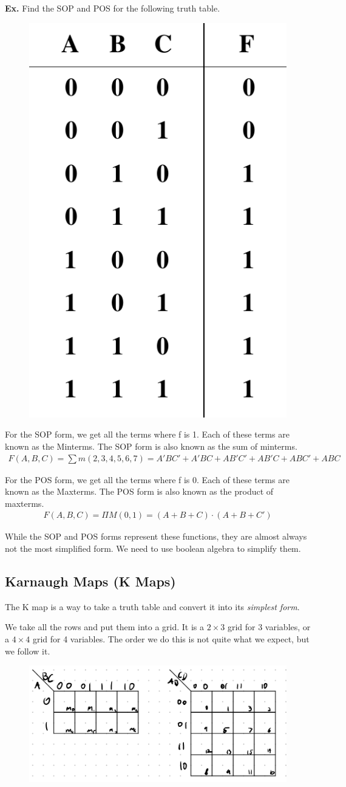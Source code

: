 \documentclass[12pt,letterpaper]{article} \usepackage{amsmath} \usepackage{graphicx}  \usepackage{longtable}  \usepackage{amssymb}
\begin{document}
        \begin{mdframed}
            \textbf{Ex. } Find the SOP and POS for the following truth table. 

            \begin{figure}[H]
                \centering
                \includegraphics[width=0.2\linewidth]{ex1.png}
            \end{figure}

            For the SOP form, we get all the terms where f is 1. Each of these terms are known as the Minterms. The SOP form is also known as the sum of minterms. 
            \begin{align*}
                F(A,B,C) = \sum m (2,3,4,5,6,7) = A'BC' + A'BC + AB'C' + AB'C + ABC' + ABC
            \end{align*}

            For the POS form, we get all the terms where f is 0. Each of these terms are known as the Maxterms. The POS form is also known as the product of maxterms. 
            \begin{align*}
                F(A,B,C) = \Pi M(0,1) = (A+B+C)\cdot (A+B+C')
            \end{align*}
        \end{mdframed}

        While the SOP and POS forms represent these functions, they are almost always not the most simplified form. We need to use boolean algebra to simplify them. 

        \subsection{Karnaugh Maps (K Maps)}
        The K map is a way to take a truth table and convert it into its \emph{simplest form}.
        
        We take all the rows and put them into a grid. It is a $2\times 3$ grid for 3 variables, or a $4\times 4$ grid for 4 variables. The order we do this is not quite what we expect, but we follow it.

        \begin{figure}[H]
            \centering
            \includegraphics[width=0.6\linewidth]{k1.png}
        \end{figure}
\end{document}
